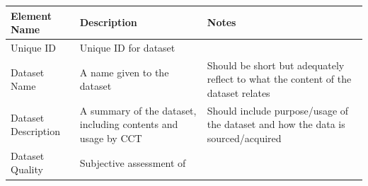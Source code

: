 \documentclass[
]{book}
\begin{document}
\begin{longtable}[]{@{}lll@{}}
\toprule
\begin{minipage}[b]{0.22\columnwidth}\raggedright
Element Name\strut
\end{minipage} & \begin{minipage}[b]{0.35\columnwidth}\raggedright
Description\strut
\end{minipage} & \begin{minipage}[b]{0.35\columnwidth}\raggedright
Notes\strut
\end{minipage}\tabularnewline
\midrule
\endhead
\begin{minipage}[t]{0.22\columnwidth}\raggedright
Unique ID\strut
\end{minipage} & \begin{minipage}[t]{0.35\columnwidth}\raggedright
Unique ID for dataset\strut
\end{minipage} & \begin{minipage}[t]{0.35\columnwidth}\raggedright
\strut
\end{minipage}\tabularnewline
\begin{minipage}[t]{0.22\columnwidth}\raggedright
Dataset Name\strut
\end{minipage} & \begin{minipage}[t]{0.35\columnwidth}\raggedright
A name given to the
dataset\strut
\end{minipage} & \begin{minipage}[t]{0.35\columnwidth}\raggedright
Should be short but
adequately reflect to
what the content of the
dataset relates\strut
\end{minipage}\tabularnewline
\begin{minipage}[t]{0.22\columnwidth}\raggedright
Dataset
Description\strut
\end{minipage} & \begin{minipage}[t]{0.35\columnwidth}\raggedright
A summary of the dataset,
including contents and
usage by CCT\strut
\end{minipage} & \begin{minipage}[t]{0.35\columnwidth}\raggedright
Should include
purpose/usage of the
dataset and how the data
is sourced/acquired\strut
\end{minipage}\tabularnewline
\begin{minipage}[t]{0.22\columnwidth}\raggedright
Dataset Quality\strut
\end{minipage} & \begin{minipage}[t]{0.35\columnwidth}\raggedright
Subjective assessment of

\end{minipage}
\end{longtable}
\end{document}
